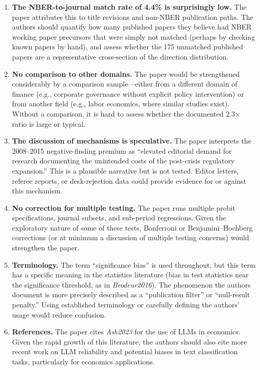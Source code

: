 \documentclass[12pt]{article}
\begin{document}
\begin{enumerate}[leftmargin=*]

  \item \textbf{The NBER-to-journal match rate of 4.4\% is surprisingly low.}
  The paper attributes this to title revisions and non-NBER publication paths.
  The authors should quantify how many published papers they believe had NBER
  working paper precursors that were simply not matched (perhaps by checking
  known papers by hand), and assess whether the 175 unmatched published papers
  are a representative cross-section of the direction distribution.

  \item \textbf{No comparison to other domains.}  The paper would be
  strengthened considerably by a comparison sample---either from a different
  domain of finance (e.g., corporate governance without explicit policy
  intervention) or from another field (e.g., labor economics, where similar
  studies exist).  Without a comparison, it is hard to assess whether the
  documented 2.3$\times$ ratio is large or typical.

  \item \textbf{The discussion of mechanisms is speculative.}  The paper
  interprets the 2008--2015 negative-finding premium as ``elevated editorial
  demand for research documenting the unintended costs of the post-crisis
  regulatory expansion.''  This is a plausible narrative but is not tested.
  Editor letters, referee reports, or desk-rejection data could provide
  evidence for or against this mechanism.

  \item \textbf{No correction for multiple testing.}  The paper runs multiple
  probit specifications, journal subsets, and sub-period regressions.  Given
  the exploratory nature of some of these tests, Bonferroni or
  Benjamini--Hochberg corrections (or at minimum a discussion of multiple
  testing concerns) would strengthen the paper.

  \item \textbf{Terminology.}  The term ``significance bias'' is used
  throughout, but this term has a specific meaning in the statistics
  literature (bias in test statistics near the significance threshold, as in
  \textit{Brodeur2016}).  The phenomenon the authors document is more
  precisely described as a ``publication filter'' or ``null-result penalty.''
  Using established terminology or carefully defining the authors' usage
  would reduce confusion.

  \item \textbf{References.}  The paper cites \textit{Ash2023} for the use of
  LLMs in economics.  Given the rapid growth of this literature, the authors
  should also cite more recent work on LLM reliability and potential biases in
  text classification tasks, particularly for economics applications.

\end{enumerate}
\end{document}
